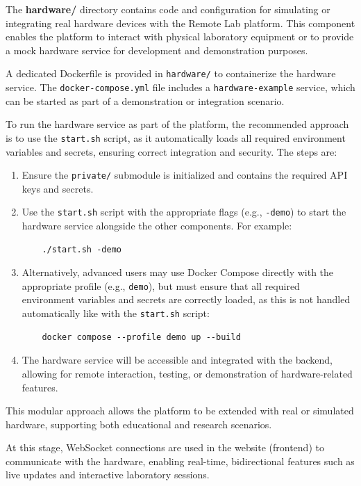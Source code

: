 The \textbf{hardware/} directory contains code and configuration for simulating or integrating real hardware devices with the Remote Lab platform. This component enables the platform to interact with physical laboratory equipment or to provide a mock hardware service for development and demonstration purposes.

A dedicated Dockerfile is provided in \texttt{hardware/} to containerize the hardware service. The \texttt{docker-compose.yml} file includes a \texttt{hardware-example} service, which can be started as part of a demonstration or integration scenario.

To run the hardware service as part of the platform, the recommended approach is to use the \texttt{start.sh} script, as it automatically loads all required environment variables and secrets, ensuring correct integration and security. The steps are:
\begin{enumerate}
    \item Ensure the \texttt{private/} submodule is initialized and contains the required API keys and secrets.
    \item Use the \texttt{start.sh} script with the appropriate flags (e.g., \texttt{-demo}) to start the hardware service alongside the other components. For example:
    \begin{verbatim}
    ./start.sh -demo
    \end{verbatim}
    \item Alternatively, advanced users may use Docker Compose directly with the appropriate profile (e.g., \texttt{demo}), but must ensure that all required environment variables and secrets are correctly loaded, as this is not handled automatically like with the \texttt{start.sh} script:
    \begin{verbatim}
    docker compose --profile demo up --build
    \end{verbatim}
    \item The hardware service will be accessible and integrated with the backend, allowing for remote interaction, testing, or demonstration of hardware-related features.
\end{enumerate}

This modular approach allows the platform to be extended with real or simulated hardware, supporting both educational and research scenarios.

At this stage, WebSocket connections are used in the website (frontend) to communicate with the hardware, enabling real-time, bidirectional features such as live updates and interactive laboratory sessions.

